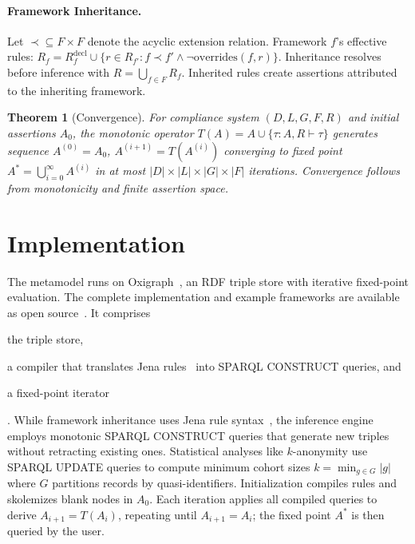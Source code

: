 \documentclass{IOS-Book-Article}
\newtheorem{theorem}{Theorem}[section]
\begin{document}
\paragraph{Framework Inheritance.}
Let $\prec \subseteq F \times F$ denote the acyclic extension relation. Framework $f$'s effective rules: $R_f = R_f^{\text{decl}} \cup \{r \in R_{f'} : f \prec f' \land \neg\text{overrides}(f, r)\}$. Inheritance resolves before inference with $R = \bigcup_{f \in F} R_f$. Inherited rules create assertions attributed to the inheriting framework.

\begin{theorem}[Convergence]\label{thm:convergence}
For compliance system $(D, L, G, F, R)$ and initial assertions $A_0$, the monotonic operator $T(A) = A \cup \{\tau : A, R \vdash \tau\}$ generates sequence $A^{(0)} = A_0$, $A^{(i+1)} = T(A^{(i)})$ converging to fixed point $A^* = \bigcup_{i=0}^{\infty} A^{(i)}$ in at most $|D| \times |L| \times |G| \times |F|$ iterations. Convergence follows from monotonicity and finite assertion space.
\end{theorem}


\section{Implementation}\label{sec:implementation}

The metamodel runs on Oxigraph~\cite{oxigraph}, an RDF triple store with iterative fixed-point evaluation. The complete implementation and example frameworks are available as open source~\cite{compliance-metamodel}. It comprises \begin{enumerate*}[label=(\arabic*)] \item the triple store, \item a compiler that translates Jena rules~\cite{jena} into SPARQL CONSTRUCT queries, and \item a fixed-point iterator\end{enumerate*}. While framework inheritance uses Jena rule syntax~\cite{jena}, the inference engine employs monotonic SPARQL CONSTRUCT queries that generate new triples without retracting existing ones. Statistical analyses like $k$-anonymity use SPARQL UPDATE queries to compute minimum cohort sizes $k = \min_{g \in G} |g|$ where $G$ partitions records by quasi-identifiers. Initialization compiles rules and skolemizes blank nodes in $A_0$. Each iteration applies all compiled queries to derive $A_{i+1}=T(A_i)$, repeating until $A_{i+1}=A_i$; the fixed point $A^*$ is then queried by the user.
\end{document}
